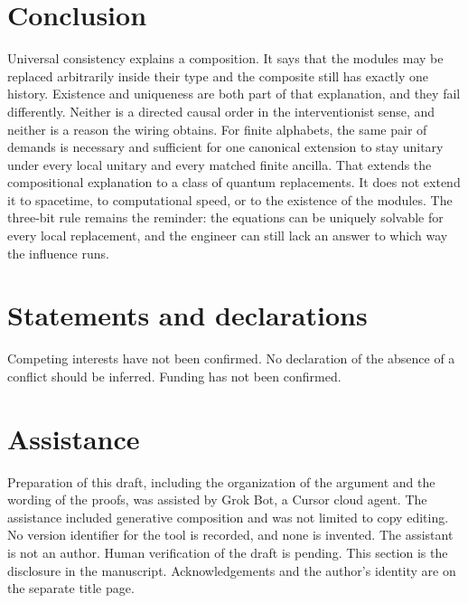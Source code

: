 \documentclass[11pt]{article}
\begin{document}
\section{Conclusion}
\label{sec:end}

Universal consistency explains a composition. It says that the modules may be replaced arbitrarily inside their type and the composite still has exactly one history. Existence and uniqueness are both part of that explanation, and they fail differently. Neither is a directed causal order in the interventionist sense, and neither is a reason the wiring obtains. For finite alphabets, the same pair of demands is necessary and sufficient for one canonical extension to stay unitary under every local unitary and every matched finite ancilla. That extends the compositional explanation to a class of quantum replacements. It does not extend it to spacetime, to computational speed, or to the existence of the modules. The three-bit rule remains the reminder: the equations can be uniquely solvable for every local replacement, and the engineer can still lack an answer to which way the influence runs.

\section*{Statements and declarations}
Competing interests have not been confirmed. No declaration of the absence of a conflict should be inferred. Funding has not been confirmed.

\section*{Assistance}
Preparation of this draft, including the organization of the argument and the wording of the proofs, was assisted by Grok Bot, a Cursor cloud agent. The assistance included generative composition and was not limited to copy editing. No version identifier for the tool is recorded, and none is invented. The assistant is not an author. Human verification of the draft is pending. This section is the disclosure in the manuscript. Acknowledgements and the author's identity are on the separate title page.
\end{document}
